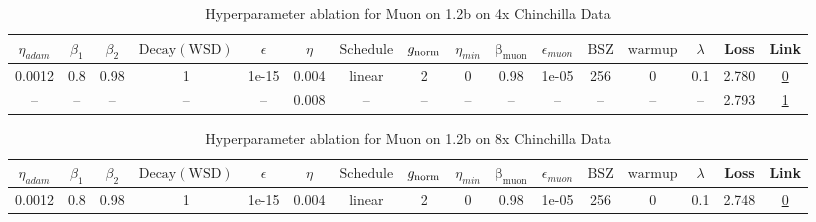 \begin{table}[H]
\centering
\caption{Hyperparameter ablation for Muon on 1.2b on 4x Chinchilla Data}
\label{tab:ablation_muon_1.2b_on_4x_chinchilla_data}
\begin{tabular}{cccccccccccccccc}
\toprule
$\eta_{adam}$ & $\beta_1$ & $\beta_2$ & $\mathrm{Decay (WSD)}$ & $\epsilon$ & $\eta$ & $\mathrm{Schedule}$ & $g_{\mathrm{norm}}$ & $\eta_{min}$ & $\mathrm{\beta_{muon}}$ & $\epsilon_{muon}$ & $\mathrm{BSZ}$ & $\mathrm{warmup}$ & $\lambda$ & Loss & Link \\
\midrule
0.0012 & 0.8 & 0.98 & 1 & 1e-15 & 0.004 & linear & 2 & 0 & 0.98 & 1e-05 & 256 & 0 & 0.1 & 2.780 & \href{https://wandb.ai/marin-community/optimizer-scaling/runs/sweep-1.2b-96B-muon5ad2a1lr0.004-wd0.1-minlr0.0-warmup0.0-b10.8--05a146}{0} \\
\midrule
-- & -- & -- & -- & -- & 0.008 & -- & -- & -- & -- & -- & -- & -- & -- & 2.793 & \href{https://wandb.ai/marin-community/optimizer-scaling/runs/sweep-1.2b-96B-muonforced13606lr0.008-wd0.1-minlr0.0-warmup0.0-b-fc19f3}{1} \\
\bottomrule
\end{tabular}
\end{table}

\begin{table}[H]
\centering
\caption{Hyperparameter ablation for Muon on 1.2b on 8x Chinchilla Data}
\label{tab:ablation_muon_1.2b_on_8x_chinchilla_data}
\begin{tabular}{cccccccccccccccc}
\toprule
$\eta_{adam}$ & $\beta_1$ & $\beta_2$ & $\mathrm{Decay (WSD)}$ & $\epsilon$ & $\eta$ & $\mathrm{Schedule}$ & $g_{\mathrm{norm}}$ & $\eta_{min}$ & $\mathrm{\beta_{muon}}$ & $\epsilon_{muon}$ & $\mathrm{BSZ}$ & $\mathrm{warmup}$ & $\lambda$ & Loss & Link \\
\midrule
0.0012 & 0.8 & 0.98 & 1 & 1e-15 & 0.004 & linear & 2 & 0 & 0.98 & 1e-05 & 256 & 0 & 0.1 & 2.748 & \href{https://wandb.ai/marin-community/optimizer-scaling/runs/sweep-1.2b-193B-muon4a7234lr0.004-wd0.1-minlr0.0-warmup0.0-b10.8-2335ab}{0} \\
\midrule
\bottomrule
\end{tabular}
\end{table}

